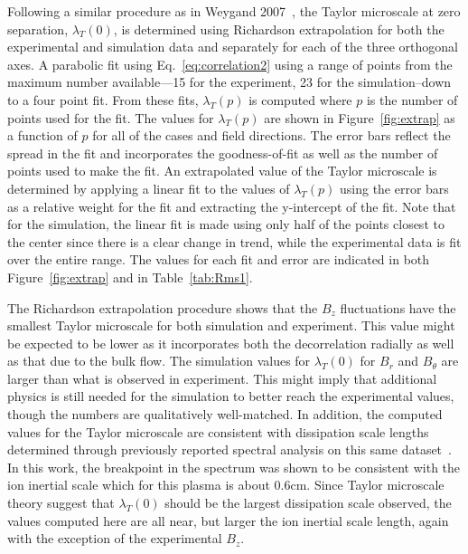 \documentclass[aps,prl,amsmath,amssymb,reprint,superscriptaddress]{revtex4-1} %
\begin{document}
Following a similar procedure as in Weygand 2007~\cite{Weygand07}, the Taylor microscale at zero separation, $\lambda_{T}(0)$, is determined using Richardson extrapolation for both the experimental and simulation data and separately for each of the three orthogonal axes. A parabolic fit using Eq.~\ref{eq:correlation2} using a range of points from the maximum number available---15 for the experiment, 23 for the simulation--down to a four point fit. From these fits, $\lambda_{T}(p)$ is computed where $p$ is the number of points used for the fit. The values for $\lambda_{T}(p)$ are shown in Figure~\ref{fig:extrap} as a function of $p$ for all of the cases and field directions. The error bars reflect the spread in the fit and incorporates the goodness-of-fit as well as the number of points used to make the fit. An extrapolated value of the Taylor microscale is determined by applying a linear fit to the values of $\lambda_{T}(p)$ using the error bars as a relative weight for the fit and extracting the y-intercept of the fit. Note that for the simulation, the linear fit is made using only half of the points closest to the center since there is a clear change in trend, while the experimental data is fit over the entire range.  The values for each fit and error are indicated in both Figure~\ref{fig:extrap} and in Table~\ref{tab:Rms1}.

The Richardson extrapolation procedure shows that the $B_{z}$ fluctuations have the smallest Taylor microscale for both simulation and experiment. This value might be expected to be lower as it incorporates both the decorrelation radially as well as that due to the bulk flow. The simulation values for $\lambda_{T}(0)$ for $B_{r}$ and $B_{\theta}$ are larger than what is observed in experiment. This might imply that additional physics is still needed for the simulation to better reach the experimental values, though the numbers are qualitatively well-matched. In addition, the computed values for the Taylor microscale are consistent with dissipation scale lengths determined through previously reported spectral analysis on this same dataset~\cite{schaffner14c}. In this work, the breakpoint in the spectrum was shown to be consistent with the ion inertial scale which for this plasma is about 0.6cm. Since Taylor microscale theory suggest that $\lambda_{T}(0)$ should be the largest dissipation scale observed, the values computed here are all near, but larger the ion inertial scale length, again with the exception of the experimental $B_{z}$.
\end{document}

